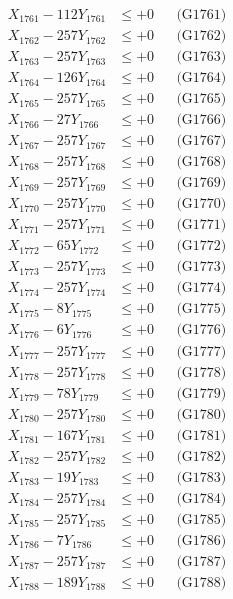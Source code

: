 \documentclass[a4paper,10pt]{article}
\begin{document}
{\begin{align}
\allowbreak
X_{1761} - 112Y_{1761} &\leq +0 && \text{(G1761)} \\
X_{1762} - 257Y_{1762} &\leq +0 && \text{(G1762)} \\
X_{1763} - 257Y_{1763} &\leq +0 && \text{(G1763)} \\
X_{1764} - 126Y_{1764} &\leq +0 && \text{(G1764)} \\
X_{1765} - 257Y_{1765} &\leq +0 && \text{(G1765)} \\
X_{1766} - 27Y_{1766} &\leq +0 && \text{(G1766)} \\
X_{1767} - 257Y_{1767} &\leq +0 && \text{(G1767)} \\
X_{1768} - 257Y_{1768} &\leq +0 && \text{(G1768)} \\
X_{1769} - 257Y_{1769} &\leq +0 && \text{(G1769)} \\
X_{1770} - 257Y_{1770} &\leq +0 && \text{(G1770)} \\
\allowbreak
X_{1771} - 257Y_{1771} &\leq +0 && \text{(G1771)} \\
X_{1772} - 65Y_{1772} &\leq +0 && \text{(G1772)} \\
X_{1773} - 257Y_{1773} &\leq +0 && \text{(G1773)} \\
X_{1774} - 257Y_{1774} &\leq +0 && \text{(G1774)} \\
X_{1775} - 8Y_{1775} &\leq +0 && \text{(G1775)} \\
X_{1776} - 6Y_{1776} &\leq +0 && \text{(G1776)} \\
X_{1777} - 257Y_{1777} &\leq +0 && \text{(G1777)} \\
X_{1778} - 257Y_{1778} &\leq +0 && \text{(G1778)} \\
X_{1779} - 78Y_{1779} &\leq +0 && \text{(G1779)} \\
X_{1780} - 257Y_{1780} &\leq +0 && \text{(G1780)} \\
\allowbreak
X_{1781} - 167Y_{1781} &\leq +0 && \text{(G1781)} \\
X_{1782} - 257Y_{1782} &\leq +0 && \text{(G1782)} \\
X_{1783} - 19Y_{1783} &\leq +0 && \text{(G1783)} \\
X_{1784} - 257Y_{1784} &\leq +0 && \text{(G1784)} \\
X_{1785} - 257Y_{1785} &\leq +0 && \text{(G1785)} \\
X_{1786} - 7Y_{1786} &\leq +0 && \text{(G1786)} \\
X_{1787} - 257Y_{1787} &\leq +0 && \text{(G1787)} \\
X_{1788} - 189Y_{1788} &\leq +0 && \text{(G1788)} \\

\end{align}}
\end{document}

